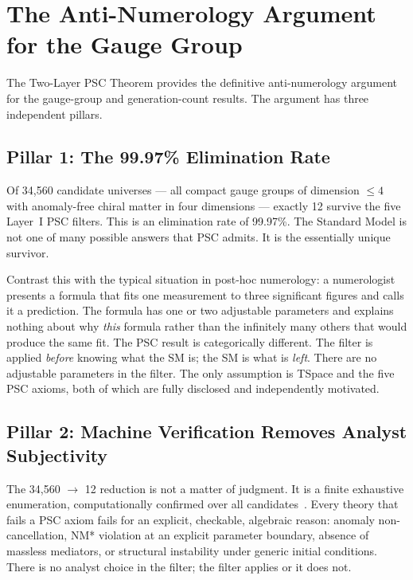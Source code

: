 \documentclass[11pt,openany]{book}
\theoremstyle{remark}
\begin{document}
\FloatBarrier

\section{The Anti-Numerology Argument for the Gauge Group}
\label{sec:antinum_ch2}

The Two-Layer PSC Theorem provides the definitive anti-numerology argument for the
gauge-group and generation-count results. The argument has three independent pillars.

\subsection*{Pillar 1: The 99.97\% Elimination Rate}

Of 34,560 candidate universes --- all compact gauge groups of dimension $\leq 4$ with
anomaly-free chiral matter in four dimensions --- exactly 12 survive the five Layer~I
PSC filters. This is an elimination rate of 99.97\%. The Standard Model is not one of
many possible answers that PSC admits. It is the essentially unique survivor.

Contrast this with the typical situation in post-hoc numerology: a numerologist
presents a formula that fits one measurement to three significant figures and calls it
a prediction. The formula has one or two adjustable parameters and explains nothing
about why \emph{this} formula rather than the infinitely many others that would
produce the same fit. The PSC result is categorically different. The filter is applied
\emph{before} knowing what the SM is; the SM is what is \emph{left}. There are no
adjustable parameters in the filter. The only assumption is TSpace and the five PSC
axioms, both of which are fully disclosed and independently motivated.

\subsection*{Pillar 2: Machine Verification Removes Analyst Subjectivity}

The 34,560 $\to$ 12 reduction is not a matter of judgment. It is a finite exhaustive
enumeration, computationally confirmed over all candidates~\cite{SpivackNEMS05}.
Every theory that fails a PSC axiom fails for an explicit, checkable, algebraic reason:
anomaly non-cancellation, NM* violation at an explicit parameter boundary,
absence of massless mediators, or structural instability under generic initial
conditions. There is no analyst choice in the filter; the filter applies or it does not.
\end{document}
